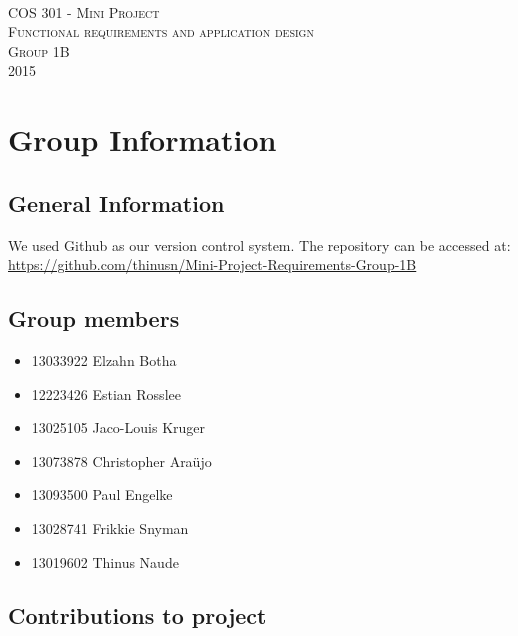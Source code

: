 \documentclass [a4paper,12pt] {article}
\begin{document}
\begin{titlepage}
	\begin{center}
		\textsc{\huge\\[5cm] COS 301 - Mini Project}\\[1cm]
		\textsc{\huge Functional requirements and application design}\\[1cm]
		\textsc{\huge Group 1B}\\[1cm]
		\textsc{\large 2015}
	\end{center}
\end{titlepage}
\tableofcontents
\pagebreak
\section{Group Information}
	\subsection{General Information}
	We used Github as our version control system. The repository can be accessed at: \linebreak \url{https://github.com/thinusn/Mini-Project-Requirements-Group-1B}
	\subsection{Group members}
	\begin{itemize}
		\item 13033922 Elzahn Botha
		\item 12223426 Estian Rosslee
		\item 13025105 Jaco-Louis Kruger
		\item 13073878 Christopher Araüjo
		\item 13093500 Paul Engelke
		\item 13028741 Frikkie Snyman
		\item 13019602 Thinus Naude
	\end{itemize}
	\subsection{Contributions to project}
\end{document}
